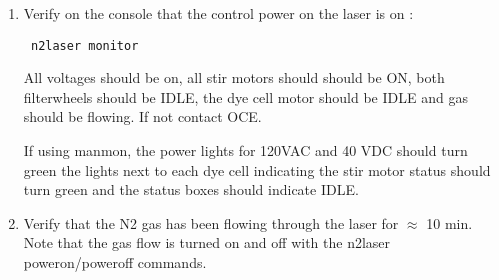 \begin{enumerate}
\begin{center}
                 {\bf Turning On the Laser}
\end{center}

 \item\checkbox Verify on the console that the control power on the laser is on :
\begin{verbatim}
 n2laser monitor
\end{verbatim} 
  All voltages should be on, all stir motors should should be ON,
 both filterwheels should be IDLE, the dye cell motor should be IDLE and
 gas should be flowing. If not contact OCE.

     If using manmon, the 
  power lights for 120VAC and 40 VDC should turn green
       the lights next to each dye cell indicating the stir motor
       status should turn green and the status boxes should indicate
  IDLE.



 \item\checkbox Verify that the N2 gas has been flowing through the laser for
    $\approx$ 10 min. Note that the gas flow is turned on and off with the 
    n2laser poweron/poweroff commands.





\end{enumerate}
